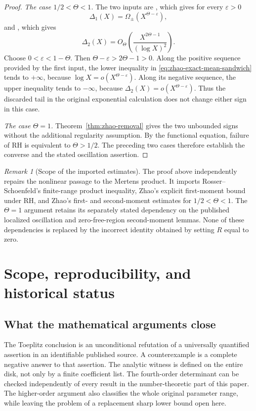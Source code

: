 \documentclass[11pt,a4paper]{article}
\numberwithin{equation}{section}
\theoremstyle{definition}\newtheorem{definition}[theorem]{Definition}
\theoremstyle{remark}\newtheorem{remark}[theorem]{Remark}
\begin{document}
\begin{proof}
\emph{The case $1/2<\Theta<1$.}
The two inputs are
\cite[Eq.~(20)]{Zhao2025}, which gives for every $\varepsilon>0$
\[
 \Delta_1(X)=\Omega_\pm(X^{\Theta-\varepsilon}),
\]
and \cite[Lemma~9]{Zhao2025}, which gives
\[
 \Delta_2(X)=O_\Theta\!\left(
       \frac{X^{2\Theta-1}}{(\log X)^2}\right).
\]
Choose $0<\varepsilon<1-\Theta$. Then
$\Theta-\varepsilon>2\Theta-1>0$. Along the positive sequence
provided by the first input, the lower inequality in
\eqref{eq:zhao-exact-mean-sandwich} tends to $+\infty$, because
$\log X=o(X^{\Theta-\varepsilon})$. Along its negative sequence,
the upper inequality tends to $-\infty$, because
$\Delta_2(X)=o(X^{\Theta-\varepsilon})$. Thus the discarded tail in
the original exponential calculation does not change either sign in
this case.

\emph{The case $\Theta=1$.}
Theorem~\ref{thm:zhao-removal} gives the two unbounded signs without
the additional regularity assumption. By the functional equation,
failure of RH is equivalent to $\Theta>1/2$. The preceding two cases
therefore establish the converse and the stated oscillation assertion.
\end{proof}

\begin{remark}[Scope of the imported estimates]
The proof above independently repairs the nonlinear passage to the
Mertens product. It imports Rosser--Schoenfeld's finite-range product
inequality, Zhao's explicit first-moment bound under RH, and Zhao's
first- and second-moment estimates for $1/2<\Theta<1$.
The $\Theta=1$ argument retains its separately stated dependency on the
published localized oscillation and zero-free-region second-moment
lemmas. None of these dependencies is replaced by the incorrect
identity obtained by setting $R$ equal to zero.
\end{remark}

\section{Scope, reproducibility, and historical status}
\label{sec:audit}

\subsection{What the mathematical arguments close}

The Toeplitz conclusion is an unconditional refutation of a universally
quantified assertion in an identifiable published source. A counterexample
is a complete negative answer to that assertion. The analytic witness is
defined on the entire disk, not only by a finite coefficient list. The
fourth-order determinant can be checked independently of every result in
the number-theoretic part of this paper. The higher-order argument also
classifies the whole original parameter range, while leaving the problem
of a replacement sharp lower bound open here.
\end{document}
